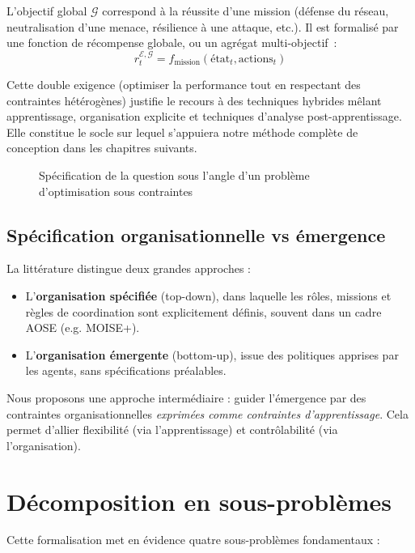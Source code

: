 L’objectif global $\mathcal{G}$ correspond à la réussite d’une mission (défense du réseau, neutralisation d’une menace, résilience à une attaque, etc.). Il est formalisé par une fonction de récompense globale, ou un agrégat multi-objectif~:
\[
  r^{\mathcal{E}, \mathcal{G}}_t = f_{\text{mission}}(\text{état}_t, \text{actions}_t)
\]

Cette double exigence (optimiser la performance tout en respectant des contraintes hétérogènes) justifie le recours à des techniques hybrides mêlant apprentissage, organisation explicite et techniques d’analyse post-apprentissage. Elle constitue le socle sur lequel s’appuiera notre méthode complète de conception dans les chapitres suivants.

\begin{figure}[H]
  \centering
  \resizebox{\textwidth}{!}{%
    
  }
  \caption{Spécification de la question sous l'angle d'un problème d'optimisation sous contraintes}
  \label{fig:constrained_optimization_overview}
\end{figure}

\subsection{Spécification organisationnelle vs émergence}

La littérature distingue deux grandes approches :
\begin{itemize}
  \item L’\textbf{organisation spécifiée} (top-down), dans laquelle les rôles, missions et règles de coordination sont explicitement définis, souvent dans un cadre AOSE (e.g. MOISE+).
  \item L’\textbf{organisation émergente} (bottom-up), issue des politiques apprises par les agents, sans spécifications préalables.
\end{itemize}

Nous proposons une approche intermédiaire : guider l’émergence par des contraintes organisationnelles \emph{exprimées comme contraintes d’apprentissage}. Cela permet d’allier flexibilité (via l’apprentissage) et contrôlabilité (via l’organisation).

\section{Décomposition en sous-problèmes}

Cette formalisation met en évidence quatre sous-problèmes fondamentaux :

